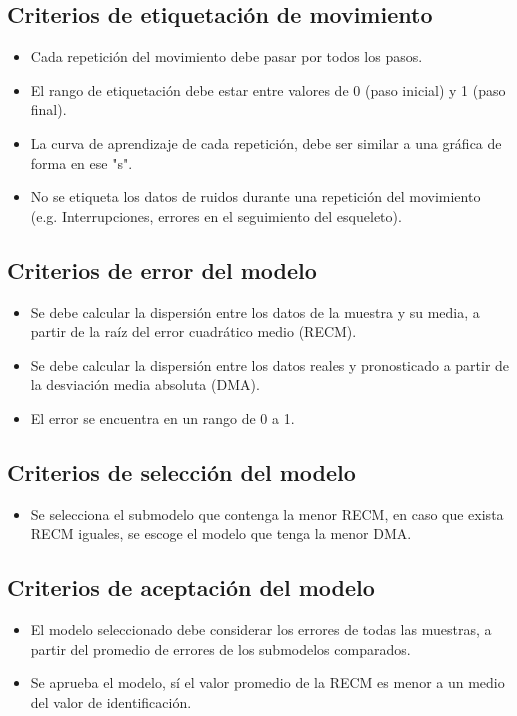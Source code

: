 \subsection{Criterios de etiquetaci\'on de movimiento}
\begin{itemize}
	\item Cada repetici\'on del movimiento debe pasar por todos los pasos.
	\item El rango de etiquetaci\'on debe estar entre valores de 0 (paso inicial) y 1 (paso final).
	\item La curva de aprendizaje de cada repetici\'on, debe ser similar a una gr\'afica de forma en ese "s".
	\item No se etiqueta los datos de ruidos durante una repetici\'on del movimiento (e.g. Interrupciones, errores en el seguimiento del esqueleto).
\end{itemize}
\subsection{Criterios de error del modelo}
\begin{itemize}
	\item Se debe calcular la dispersi\'on entre los datos de la muestra y su media, a partir de la ra\'iz del error cuadr\'atico medio (RECM).
	\item Se debe calcular la dispersi\'on entre los datos reales y pronosticado a partir de la desviaci\'on media absoluta (DMA). 
	\item El error se encuentra en un rango de 0 a 1.
\end{itemize}
\subsection{Criterios de selecci\'on del modelo}
\begin{itemize}
	\item Se selecciona el submodelo que contenga la  menor RECM, en caso que exista RECM iguales, se escoge el modelo que tenga la menor DMA.
\end{itemize}
\subsection{Criterios de aceptaci\'on del modelo}
\begin{itemize}
	\item El modelo seleccionado debe considerar los errores de todas las muestras, a partir del promedio de errores de los submodelos comparados.
	\item Se aprueba el modelo, s\'i el valor promedio de la RECM es menor a un medio del valor de  identificaci\'on.
\end{itemize}